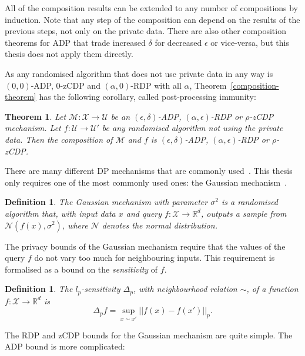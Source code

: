 \documentclass[english,twoside,openright]{HYgraduMLDS}
\newtheorem{theorem}[lemma]{Theorem}
\newtheorem{definition}[lemma]{Definition}
\newcommand{\R}{\mathbb{R}}
\newcommand{\calm}{{\mathcal{M}}}
\newcommand{\calx}{{\mathcal{X}}}
\newcommand{\calu}{{\mathcal{U}}}
\newcommand{\caln}{{\mathcal{N}}}
\begin{document}
All of the composition results can be extended to any number of compositions 
by induction. Note that any step of the composition can depend on the results 
of the previous steps, not only on the private data. There are also other composition
theorems for ADP that trade increased \(\delta\) for decreased \(\epsilon\)
or vice-versa, but this thesis does not apply them directly.

As any randomised algorithm that does not use private data in any way is
\((0, 0)\)-ADP, 0-zCDP and \((\alpha, 0)\)-RDP with all \(\alpha\), 
Theorem~\ref{composition-theorem} has the following corollary, called 
post-processing immunity:

\begin{theorem}
  Let \(\calm\colon \calx\to \calu\) be an \((\epsilon, \delta)\)-ADP,
  \((\alpha, \epsilon)\)-RDP or \(\rho\)-zCDP mechanism.
  Let \(f\colon \calu\to \calu'\) be any randomised algorithm
  not using the private data. Then the composition of \(\calm\) and \(f\)
  is \((\epsilon, \delta)\)-ADP, \((\alpha, \epsilon)\)-RDP or \(\rho\)-zCDP.
\end{theorem}

There are many different DP mechanisms that are commonly used~\cite{DwR14}.
This thesis only requires one of the most commonly 
used ones: the Gaussian mechanism~\cite{DKM06}.
\begin{definition}
  The Gaussian mechanism with parameter \(\sigma^2\) is a randomised algorithm that,
  with input data \(x\) and query \(f\colon \calx\to \R^{d}\), outputs a sample from
  \(\caln(f(x), \sigma^2)\), where \(\caln\) denotes the normal distribution.
\end{definition}

The privacy bounds of the Gaussian mechanism require that the values of the
query \(f\) do not vary too much for neighbouring inputs. This requirement
is formalised as a bound on the \emph{sensitivity} of \(f\).
\begin{definition}
    The \(l_p\)-sensitivity \(\Delta_p\), with neighbourhood relation \(\sim\),
    of a function \(f\colon \calx \to \R^d\)
    is
    \[
        \Delta_p f = \sup_{x\sim x'}||f(x) - f(x')||_p.
    \]
\end{definition}

The RDP and zCDP bounds for the Gaussian 
mechanism are quite simple. The ADP bound is more complicated:
\end{document}
